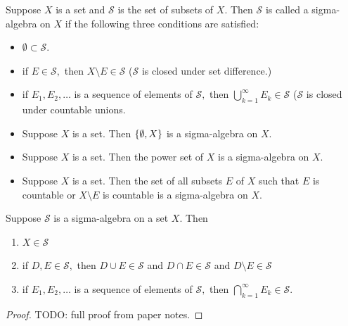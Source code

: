 \documentclass{article}
\begin{document}
\begin{definition}
	Suppose $X$ is a \@{set} and $\mathcal{S}$ is the set of \@{subsets} of $X.$ Then $\mathcal{S}$ is called a \@{sigma-algebra} on $X$ if the following three conditions are satisfied:
	\begin{itemize}
		\item $\emptyset \subset \mathcal{S}.$
		\item if $E \in \mathcal{S},$ then $X \setminus E \in \mathcal{S}$ ($\mathcal{S}$ is \@{closed} under \@{set difference}.)
		\item if $E_1, E_2, \dots$ is a \@{sequence} of \@{elements} of $\mathcal{S},$ then $\bigcup_{k=1}^{\infty} E_k \in \mathcal{S}$ ($\mathcal{S}$ is \@{closed} under \@{countable} \@{unions}.
	\end{itemize}
\end{definition}
\begin{example}
	\begin{itemize}
		\item Suppose $X$ is a set. Then $\left\{ \emptyset, X \right\}$ is a \@{sigma-algebra} on $X$.
		\item Suppose $X$ is a set. Then the \@{power set} of $X$ is a \@{sigma-algebra} on $X$.
		\item Suppose $X$ is a set. Then the set of all \@{subsets} $E$ of $X$ such that $E$ is \@{countable} or $X \setminus E$ is countable is a \@{sigma-algebra} on $X$.
	\end{itemize}
\end{example}

\begin{theorem}
	Suppose $\mathcal{S}$ is a \@{sigma-algebra} on a \@{set} $X$. Then
	\begin{enumerate}[label=(\alph*)]
		\item $X \in \mathcal{S}$
		\item if $D, E \in \mathcal{S},$ then $D \cup E \in \mathcal{S}$ and $D \cap E \in \mathcal{S}$ and $D \setminus E \in \mathcal{S}$
		\item if $E_1, E_2, \dots$ is a \@{sequence} of \@{elements} of $\mathcal{S},$ then $\bigcap_{k=1}^\infty E_k \in \mathcal{S}.$
	\end{enumerate}
\end{theorem}
\begin{proof}
	TODO: full proof from paper notes.
\end{proof}
\end{document}

